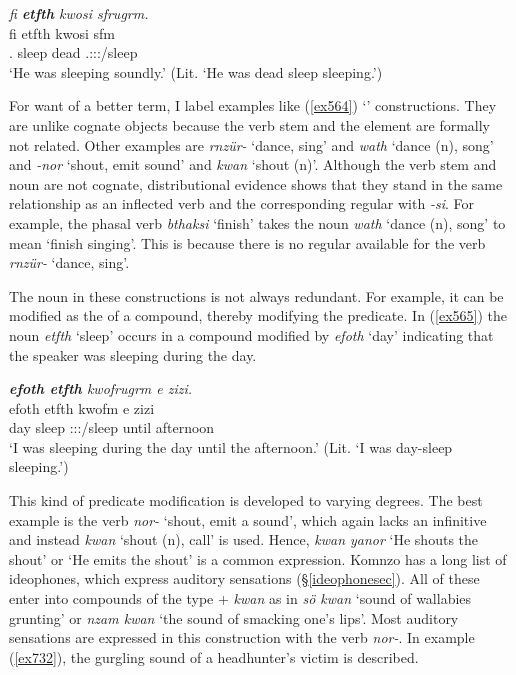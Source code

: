 \begin{exe}
	\ex \emph{fi \textbf{etfth} kwosi sfrugrm.}\\
	\gll fi etfth kwosi sfm\\
	\Third.\Abs{} sleep dead \Tsg.\Masc:\Sbj:\Pst:\Dur/sleep\\
	\trans `He was sleeping soundly.' (Lit. `He was dead sleep sleeping.')\\
	\label{ex564}
\end{exe}

For want of a better term, I label examples like (\ref{ex564}) `' constructions. They are unlike cognate objects because the verb stem and the  element are formally not related. Other examples are \emph{rnzür-} `dance, sing' and \emph{wath} `dance (n), song' and \emph{-nor} `shout, emit sound' and \emph{kwan} `shout (n)'. Although the verb stem and noun are not cognate, distributional evidence shows that they stand in the same relationship as an inflected verb and the corresponding regular  with \emph{-si}. For example, the phasal verb \emph{bthaksi} `finish' takes the noun \emph{wath} `dance (n), song' to mean `finish singing'. This is because there is no regular  available for the verb \emph{rnzür-} `dance, sing'.

The noun in these constructions is not always redundant. For example, it can be modified as the  of a compound, thereby modifying the predicate. In (\ref{ex565}) the noun \emph{etfth} `sleep' occurs in a compound modified by \emph{efoth} `day' indicating that the speaker was sleeping during the day.

\begin{exe}
	\ex \emph{\textbf{efoth etfth} kwofrugrm e zizi.}\\
	\gll efoth etfth kwofm e zizi\\
	day sleep \Fsg:\Sbj:\Pst:\Dur/sleep until afternoon\\
	\trans `I was sleeping during the day until the afternoon.' (Lit. `I was day-sleep sleeping.')
	\label{ex565}
\end{exe}

This kind of predicate modification is developed to varying degrees. The best example is the  verb \emph{nor-} `shout, emit a sound', which again lacks an infinitive and instead \emph{kwan} `shout (n), call' is used. Hence, \emph{kwan yanor} `He shouts the shout' or `He emits the shout' is a common expression. Komnzo has a long list of ideophones, which express auditory sensations (\S{}\ref{ideophonesec}). All of these enter into compounds of the type  + \emph{kwan} as in \emph{sö kwan} `sound of wallabies grunting' or \emph{nzam kwan} `the sound of smacking one's lips'. Most auditory sensations are expressed in this construction with the verb \emph{nor-}. In example (\ref{ex732}), the gurgling sound of a headhunter's victim is described.

